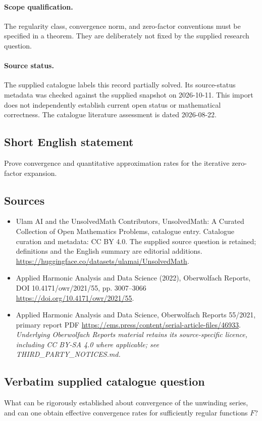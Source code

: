\documentclass[11pt]{article}
\begin{document}
\paragraph{Scope qualification.}
The regularity class, convergence norm, and zero-factor conventions must be specified in a theorem. They are deliberately not fixed by the supplied research question.
\paragraph{Source status.}
The supplied catalogue labels this record partially solved. Its source-status metadata was checked against the supplied snapshot on 2026-10-11. This import does not independently establish current open status or mathematical correctness. The catalogue literature assessment is dated 2026-08-22.
\subsection{Short English statement}
Prove convergence and quantitative approximation rates for the iterative zero-factor expansion.
\subsection{Sources}
\begin{itemize}
\item[S1] Ulam AI and the UnsolvedMath Contributors, UnsolvedMath: A Curated Collection of Open Mathematics Problems, catalogue entry. Catalogue curation and metadata: CC BY 4.0. The supplied source question is retained; definitions and the English summary are editorial additions.
\url{https://huggingface.co/datasets/ulamai/UnsolvedMath}.
\item[S2] Applied Harmonic Analysis and Data Science (2022), Oberwolfach Reports, DOI 10.4171/owr/2021/55, pp. 3007--3066
\url{https://doi.org/10.4171/owr/2021/55}.
\item[S3] Applied Harmonic Analysis and Data Science, Oberwolfach Reports 55/2021, primary report PDF
\url{https://ems.press/content/serial-article-files/46933}.
\textit{Underlying Oberwolfach Reports material retains its source-specific licence, including CC BY-SA 4.0 where applicable; see THIRD\_PARTY\_NOTICES.md.}
\end{itemize}
\subsection{Verbatim supplied catalogue question}
What can be rigorously established about convergence of the unwinding series, and can one obtain effective convergence rates for sufficiently regular functions $F$?
\end{document}
